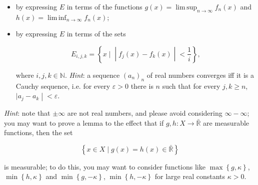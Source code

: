 \begin{itemize}
\item
  by expressing \(E\) in terms of the functions \(g(x) = \operatorname{lim\, sup}_{n\rightarrow\infty}f_{n}(x)\) and \(h(x) = \operatorname{lim\, inf}_{n\rightarrow\infty}f_{n}(x)\);
\item
  by expressing \(E\) in terms of the sets

  \[E_{i,j,k} = \left\{ x \mid \middle| f_{j}(x) - f_{k}(x) \middle| < \frac{1}{i} \right\},\]

  where \(i,j,k \in \mathbb{N}\). \emph{Hint}: a sequence \((a_{n})_{n}\) of real numbers converges iff it is a Cauchy sequence, i.e. for every \(\varepsilon > 0\) there is \(n\) such that for every \(j,k \geq n\), \(\left. |a_{j} - a_{k} \middle| < \varepsilon \right.\).
\end{itemize}

\emph{Hint}: note that \(\pm \infty\) are not real numbers, and please avoid considering \(\infty - \infty\); you may want to prove a lemma to the effect that if \(g,h:X\rightarrow\bar{\mathbb{R}}\) are measurable functions, then the set

\[\left\{ {x \in X \mid g(x) = h(x) \in \bar{\mathbb{R}}} \right\}\]

is measurable; to do this, you may want to consider functions like \(\max\left\{ {g,\kappa} \right\}\), \(\min\left\{ {h,\kappa} \right\}\) and \(\min\left\{ {g, - \kappa} \right\}\), \(\min\left\{ {h, - \kappa} \right\}\) for large real constants \(\kappa > 0\).

